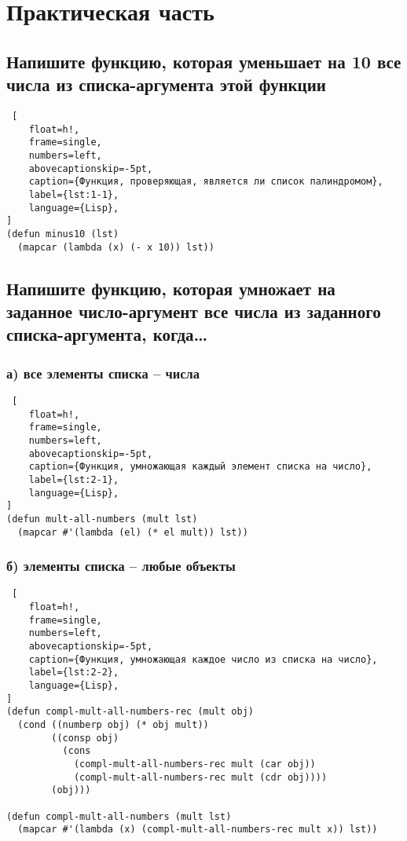 \chapter{Практическая часть}

\section{Напишите функцию, которая уменьшает на 10 все числа из списка-аргумента этой функции}

\begin{lstlisting} [
	float=h!,
	frame=single,
	numbers=left,
	abovecaptionskip=-5pt,
	caption={Функция, проверяющая, является ли список палиндромом},
	label={lst:1-1},
	language={Lisp},
]
(defun minus10 (lst) 
  (mapcar (lambda (x) (- x 10)) lst))
\end{lstlisting}

\section{Напишите функцию, которая умножает на заданное число-аргумент все числа из заданного списка-аргумента, когда\dots}

\subsection{а) все элементы списка -- числа}

\begin{lstlisting} [
	float=h!,
	frame=single,
	numbers=left,
	abovecaptionskip=-5pt,
	caption={Функция, умножающая каждый элемент списка на число},
	label={lst:2-1},
	language={Lisp},
]
(defun mult-all-numbers (mult lst)
  (mapcar #'(lambda (el) (* el mult)) lst))
\end{lstlisting}

\subsection{б) элементы списка -- любые объекты}

\begin{lstlisting} [
	float=h!,
	frame=single,
	numbers=left,
	abovecaptionskip=-5pt,
	caption={Функция, умножающая каждое число из списка на число},
	label={lst:2-2},
	language={Lisp},
]
(defun compl-mult-all-numbers-rec (mult obj)
  (cond ((numberp obj) (* obj mult))
        ((consp obj)
          (cons
            (compl-mult-all-numbers-rec mult (car obj))
            (compl-mult-all-numbers-rec mult (cdr obj))))
        (obj)))

(defun compl-mult-all-numbers (mult lst)
  (mapcar #'(lambda (x) (compl-mult-all-numbers-rec mult x)) lst))
\end{lstlisting}

